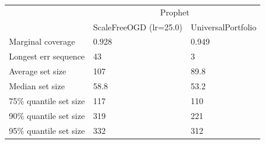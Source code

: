 \begin{tabular}{lll}
\toprule
& \multicolumn{2}{c}{Prophet} \\
& ScaleFreeOGD (lr=25.0) & UniversalPortfolio \\
\midrule
Marginal coverage & 0.928 & 0.949 \\
Longest err sequence & 43 & 3 \\
Average set size & 107 & 89.8 \\
Median set size & 58.8 & 53.2 \\
75\% quantile set size & 117 & 110 \\
90\% quantile set size & 319 & 221 \\
95\% quantile set size & 332 & 312 \\
\bottomrule
\end{tabular}
